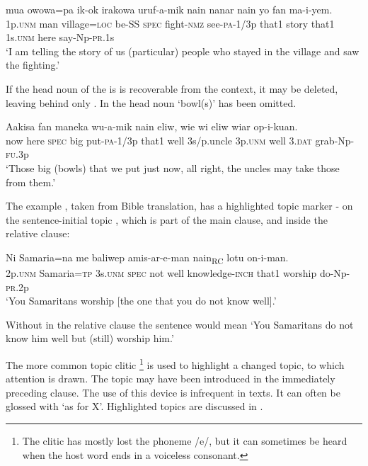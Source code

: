 \ea%
\label{ex:3:x1683}
\gll {\ob} mua owowa=pa ik-ok  irakowa uruf-a-mik nain{\cb} nanar nain yo fan ma-i-yem.\\
1p.\textsc{unm} man village=\textsc{loc} be-SS \textsc{spec} fight-\textsc{nmz} see-\textsc{pa}-1/3p that1 story that1 1s.\textsc{unm} here say-Np-\textsc{pr}.1s\\
\glt`I am telling the story of us (particular) people who stayed in the village and saw the fighting.'
\z

If the head noun of the  is is recoverable from the context, it may be deleted, leaving behind only . In  the head noun  `bowl(s)' has been omitted.

\ea%
\label{ex:3:x1682}
\gll {\ob}Aakisa fan  maneka wu-a-mik nain{\cb} eliw, wie wi eliw wiar op-i-kuan.\\
now here \textsc{spec} big put-\textsc{pa}-1/3p that1 well 3s/p.uncle 3p.\textsc{unm} well 3.\textsc{dat} grab-Np-\textsc{fu}.3p\\
\glt`Those big (bowls) that we put just now, all right, the uncles may take those from them.'
\z

The example , taken from Bible translation, has a highlighted topic marker - on the sentence-initial topic , which is part of the main clause, and  inside the relative clause:

\ea%
\label{ex:3:x1816}
\gll Ni Samaria=na {\ob}  me baliwep amis-ar-e-man nain{\cb}\textsubscript{RC} lotu on-i-man.\\
2p.\textsc{unm} Samaria=\textsc{tp} 3s.\textsc{unm} \textsc{spec} not well knowledge-\textsc{inch} that1 worship do-Np-\textsc{pr}.2p\\
\glt`You Samaritans worship [the one that you do not know well].'
\z

Without  in the relative clause the sentence would mean `You Samaritans do not know him well but (still) worship him.'

The more common topic clitic \footnote{The clitic has mostly lost the phoneme /e/, but it can sometimes be heard when the host word ends in a voiceless consonant. } is used to highlight a changed topic, to which attention is drawn. The topic may have been introduced in the immediately preceding clause. The use of this device is infrequent in texts. It can often be glossed with `as for X'. Highlighted topics are discussed in .

